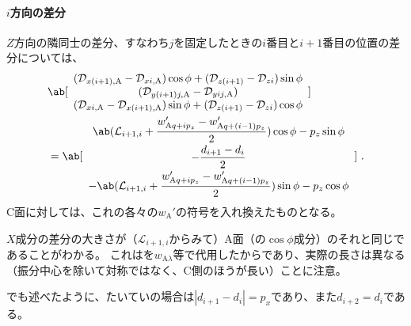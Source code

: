 \paragraph*{$i$方向の差分}
$Z$方向の隣同士の差分、すなわち$j$を固定したときの$i$番目と$i+1$番目の位置の差分については、
\begin{align*}
 &\ab[
  \begin{array}{c}
    (\mathcal D_{x(i+1),\mathrm A}-\mathcal D_{xi,\mathrm A})\cos\phi
    +(\mathcal D_{z(i+1)}-\mathcal D_{zi})\sin\phi\\
    (\mathcal D_{y(i+1)j,\mathrm A}-\mathcal D_{yij,\mathrm A})\\
    (\mathcal D_{xi,\mathrm A}-\mathcal D_{x(i+1),\mathrm A})\sin\phi
    +(\mathcal D_{z(i+1)}-\mathcal D_{zi})\cos\phi
  \end{array}
  ]\\
 &= \ab[
    \begin{array}{c}
      \displaystyle
      \ab(\mathcal L_{i+1, i}+\frac{w'_{\mathrm Aq+ip_z}-w'_{\mathrm Aq+(i-1)p_z}}2)\cos\phi
      -p_z\sin\phi\\[6pt]
      \displaystyle-\frac{d_{i+1}-d_i}2\\[6pt]
      \displaystyle
      -\ab(\mathcal L_{i+1, i}+\frac{w'_{\mathrm Aq+ip_z}-w'_{\mathrm Aq+(i-1)p_z}}2)\sin\phi
      -p_z\cos\phi
    \end{array}
    ]\ .
\end{align*}
C面に対しては、これの各々の\InnerDiameter$w_\mathrm A'$の符号を入れ換えたものとなる。
\begin{hosoku}
$X$成分の差分の大きさが（$\mathcal L_{i+1, i}$からみて）A面（の$\cos\phi$成分）のそれと同じであることがわかる。
これは\HorizontalID を$w_{\mathrm A\lambda}$等で代用したからであり、実際の長さは異なる（振分中心を除いて対称ではなく、C側のほうが長い）ことに注意。
\end{hosoku}
\begin{hosoku}[label=hosoku:generallyDimpleN]
でも述べたように、たいていの場合は$|d_{i+1}-d_i|=p_x$であり、また$d_{i+2} = d_i$である。
\end{hosoku}


